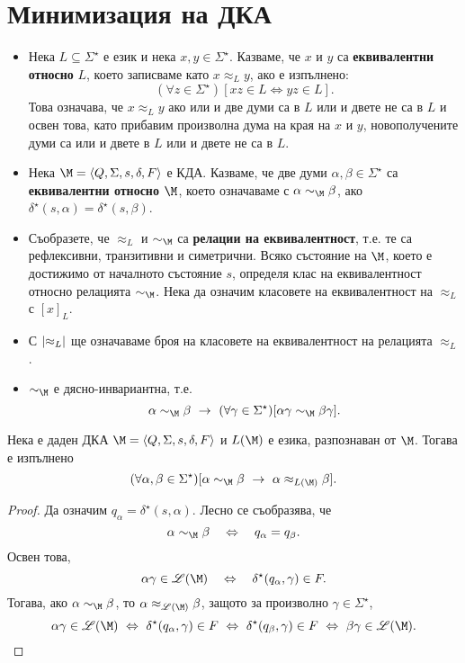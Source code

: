 \section{Минимизация на ДКА}

\begin{itemize}
\item
  Нека $L \subseteq \Sigma^\star$ е език и нека $x,y \in \Sigma^\star$.
  Казваме, че $x$ и $y$ са {\bf еквивалентни относно} $L$, което записваме 
  като $x \approx_L y$, ако е изпълнено:
  \[(\forall z \in \Sigma^\star)[xz \in L \iff yz \in L].\]
  Това означава, че $x\approx_L y$ ако или и две думи са в $L$ или и двете не са в $L$
  и освен това, като прибавим произволна дума на края на $x$ и $y$, новополучените
  думи са или и двете в $L$ или и двете не са в $L$.  
\item
  Нека $\M = \FA$ е КДА.
  Казваме, че две думи $\alpha,\beta \in \Sigma^\star$ са {\bf еквивалентни относно $\M$},
  което означаваме с $\alpha \sim_\M \beta$, ако $\delta^\star(s,\alpha) = \delta^\star(s,\beta)$.
\item
  Съобразете, че $\approx_L$ и $\sim_\M$ са {\bf релации на еквивалентност}, т.е.
  те са рефлексивни, транзитивни и симетрични.
  Всяко състояние на $\M$, което е достижимо от началното състояние $s$, определя клас на еквивалентност относно 
  релацията $\sim_\M$.  
  Нека да означим класовете на еквивалентност на $\approx_L$ с $[x]_L$.
\item
  С $\vert{\approx_L}\vert$ ще означаваме броя на класовете на еквивалентност на релацията $\approx_L$.
\item
  $\sim_\M$ е дясно-инвариантна, т.е.
  \[\alpha \sim_\M \beta\ \rightarrow\ (\forall \gamma\in\Sigma^\star)[\alpha\gamma \sim_\M \beta\gamma].\]
\end{itemize}

\begin{thm}
  \label{th:rel-finer}
  Нека е даден ДКА $\M = \FA$ и $L(\M)$ е езика, разпознаван от $\M$. Тогава е изпълнено
  \[(\forall \alpha,\beta \in \Sigma^\star)[\alpha\sim_\M\beta\ \rightarrow\ \alpha\approx_{L(\M)}\beta].\]
\end{thm}
\begin{proof}
  Да означим $q_\alpha = \delta^\star(s, \alpha)$.
  Лесно се съобразява, че 
  \[\alpha \sim_\M \beta\quad\Leftrightarrow\quad q_\alpha = q_\beta.\]
  Освен това, 
  \[\alpha\gamma \in \Ls(\M)\quad \Leftrightarrow\quad \delta^\star(q_\alpha, \gamma) \in F.\]
  Тогава, ако $\alpha \sim_\M \beta$, то  $\alpha \approx_{\Ls(\M)}\beta$, защото за произволно $\gamma \in \Sigma^\star$,
  \[\alpha\gamma \in \Ls(\M)\ \Leftrightarrow\ \delta^\star(q_\alpha,\gamma) \in F\ \Leftrightarrow\ \delta^\star(q_\beta, \gamma)\in F\ \Leftrightarrow\ \beta\gamma \in \Ls(\M).\]  
\end{proof}


